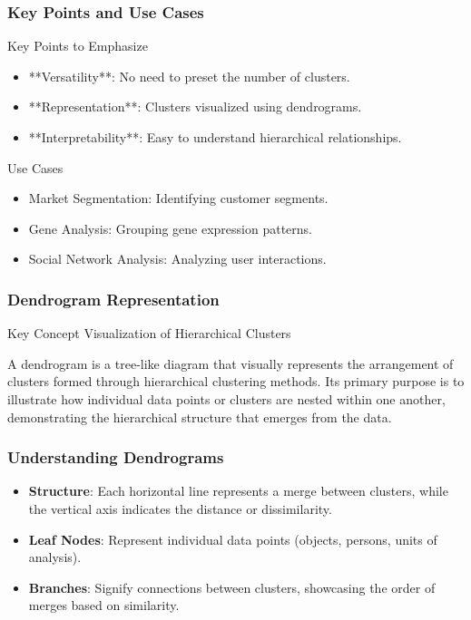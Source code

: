 \documentclass[aspectratio=169]{beamer}
\begin{document}
\begin{frame}[fragile]
    \frametitle{Key Points and Use Cases}
    \begin{block}{Key Points to Emphasize}
        \begin{itemize}
            \item **Versatility**: No need to preset the number of clusters.
            \item **Representation**: Clusters visualized using dendrograms.
            \item **Interpretability**: Easy to understand hierarchical relationships.
        \end{itemize}
    \end{block}
    
    \begin{block}{Use Cases}
        \begin{itemize}
            \item Market Segmentation: Identifying customer segments.
            \item Gene Analysis: Grouping gene expression patterns.
            \item Social Network Analysis: Analyzing user interactions.
        \end{itemize}
    \end{block}
\end{frame}

\begin{frame}[fragile]
    \frametitle{Dendrogram Representation}
    \begin{block}{Key Concept}
        Visualization of Hierarchical Clusters
    \end{block}
    A dendrogram is a tree-like diagram that visually represents the arrangement of clusters formed through hierarchical clustering methods. Its primary purpose is to illustrate how individual data points or clusters are nested within one another, demonstrating the hierarchical structure that emerges from the data.
\end{frame}

\begin{frame}[fragile]
    \frametitle{Understanding Dendrograms}
    \begin{itemize}
        \item \textbf{Structure}: Each horizontal line represents a merge between clusters, while the vertical axis indicates the distance or dissimilarity.
        \item \textbf{Leaf Nodes}: Represent individual data points (objects, persons, units of analysis).
        \item \textbf{Branches}: Signify connections between clusters, showcasing the order of merges based on similarity.
    \end{itemize}
\end{frame}
\end{document}
